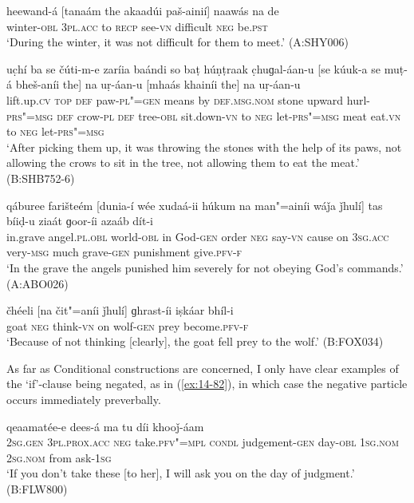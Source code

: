 \begin{exe}
\ex
\label{ex:14-78}
\gll heewand-á [tanaám the akaadúi paš-ainií] naawás  na de \\
winter-\textsc{obl} \textsc{3pl.acc} to \textsc{recp} see-\textsc{vn} difficult \textsc{neg}
be.\textsc{pst} \\
\glt `During the winter, it was not difficult for them to meet.' (A:SHY006)

\ex
\label{ex:14-79}
\gll uc̣hí ba se čúti-m-e zaríia baándi  so baṭ húṇṭraak c̣huɡal-áan-u  [se kúuk-a se muṭ-á bheš-aníi the] na uṛ-áan-u \textsc{[}mhaás khainíi the] na uṛ-áan-u \\
lift.up.\textsc{cv} \textsc{top} \textsc{def} paw-\textsc{pl"=gen} means by  \textsc{def.msg.nom} stone upward hurl-\textsc{prs"=msg}  \textsc{def} crow-\textsc{pl} \textsc{def} tree-\textsc{obl} sit.down-\textsc{vn} to \textsc{neg} let-\textsc{prs"=msg} meat eat.\textsc{vn} to \textsc{neg} let-\textsc{prs"=msg} \\
\glt `After picking them up, it was throwing the stones with the help of its paws, not allowing the crows to sit in the tree, not allowing them to eat the meat.' (B:SHB752-6)

\ex
\label{ex:14-80}
\gll qáburee farišteém [dunia-í wée xudaá-ii húkum na  man"=ainíi wáǰa
  ǰhulí] tas bíiḍ-u ziaát  ɡoor-íi azaáb dít-i \\
in.grave angel.\textsc{pl.obl} world-\textsc{obl} in God-\textsc{gen} order \textsc{neg}  say-\textsc{vn} cause on \textsc{3sg.acc} very-\textsc{msg} much grave-\textsc{gen} punishment give.\textsc{pfv-f}  \\
\glt `In the grave the angels punished him severely for not obeying God's commands.' (A:ABO026)

\ex
\label{ex:14-81}
\gll čhéeli [na čit"=aníi ǰhulí] ɡhrast-íi iṣkáar bhíl-i \\
goat \textsc{neg} think-\textsc{vn} on wolf-\textsc{gen} prey become.\textsc{pfv-f} \\
\glt `Because of not thinking [clearly], the goat fell prey to the wolf.' (B:FOX034)
\end{exe}

As far as Conditional constructions are concerned, I only have clear examples of the `if'-clause being negated, as in (\ref{ex:14-82}), in which case the negative particle occurs immediately preverbally.

\begin{exe}
\ex
\label{ex:14-82}
  qeaamatée-e dees-á ma tu díi khooǰ-áam \\
\textsc{2sg.gen} \textsc{3pl.prox.acc} \textsc{neg} take.\textsc{pfv"=mpl} \textsc{condl}  judgement-\textsc{gen} day-\textsc{obl} \textsc{1sg.nom} \textsc{2sg.nom} from ask-\textsc{1sg}  \\
\glt `If you don't take these [to her], I will ask you on the day of judgment.' (B:FLW800)
\end{exe}

